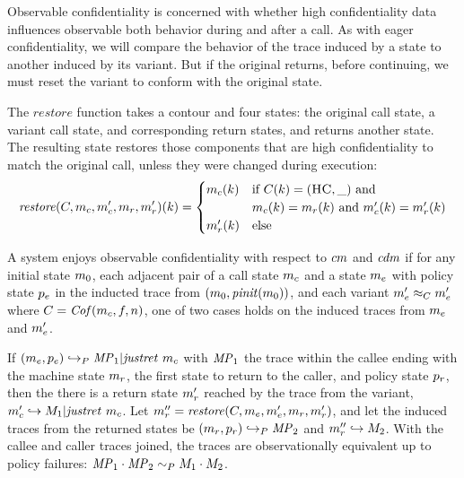 \documentclass[acmsmall,review,anonymous]{acmart}\settopmatter{printfolios=true,printccs=false,printacmref=false}
\begin{document}

      Observable confidentiality is concerned with whether high confidentiality
      data influences observable both behavior during and after a call. As with
      eager confidentiality, we will compare the behavior of the trace induced
      by a state to another induced by its variant. But if the original returns,
      before continuing, we must reset the variant to conform with the original
      state.

      The \(\mathit{restore}\) function takes a contour and four states: the
      original call state, a variant call state, and corresponding return
      states, and returns another state. The resulting state restores those
      components that are high confidentiality to match the original call,
      unless they were changed during execution:
      \[\mathit{restore}(C,m_c,m_c',m_r,m_r')(k) =
        \begin{cases}
          m_c(k) & \text{if } C(k) = (\textsc{HC},\_) \text{ and } \\
                  & m_c(k) = m_r(k) \text{ and }
                    m_c'(k) = m_r'(k) \\
          m_r'(k) & \text{else} \\
        \end{cases}\]

      A system enjoys observable confidentiality with respect to \(cm\)
      and \(\mathit{cdm}\) if for any initial state \(m_0\), each adjacent pair
      of a call state \(m_c\) and a state \(m_e\) with policy state
      \(p_e\) in the inducted trace from
      \((m_0,\mathit{pinit}(m_0))\), and each variant
      \(m_e' \approx_C m_e'\) where
      \(C = \mathit{Cof}(m_c, f, n)\), one of two cases holds
      on the induced traces from \(m_e\) and \(m_e'\).

      If \((m_e,p_e) \hookrightarrow_P \mathit{MP}_1 | \mathit{justret}\ m_c\)
      with \(\mathit{MP}_1\) the trace within the callee ending with the machine state
      \(m_r\), the first state to return to the caller, and policy state
      \(p_r\), then the there is a return state \(m_r'\) reached by the
      trace from the variant, \(m_c' \hookrightarrow M_1 |
      \mathit{justret}\ m_c\). Let \(m_r'' = \mathit{restore}(C,m_e,
      m_e',m_r,m_r')\), and let the induced traces from the
      returned states be \((m_r,p_r) \hookrightarrow_P \mathit{MP}_2\)
      and \(m_r'' \hookrightarrow M_2\). With the callee and caller
      traces joined, the traces are observationally equivalent up to policy
      failures: \(\mathit{MP}_1 \cdot \mathit{MP}_2 \sim_P M_1 \cdot M_2\).
\end{document}
